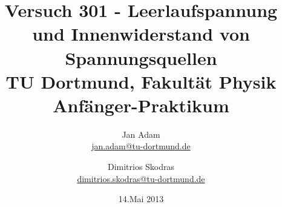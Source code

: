 



\title{Versuch 301 - Leerlaufspannung und Innenwiderstand von Spannungsquellen\\				%
\large TU Dortmund, Fakultät Physik\\ 
\normalsize Anfänger-Praktikum}

\author{Jan Adam\\			%
{\small \href{jan.adam@tu-dortmund.de}{jan.adam@tu-dortmund.de}}	%
\and						%
Dimitrios Skodras\\					%
{\small \href{dimitrios.skodras@tu-dortmund.de}{dimitrios.skodras@tu-dortmund.de}}		%
}
\date{14.Mai 2013}				%





\maketitle					%
\thispagestyle{empty} 				%



\tableofcontents


\newpage					%


